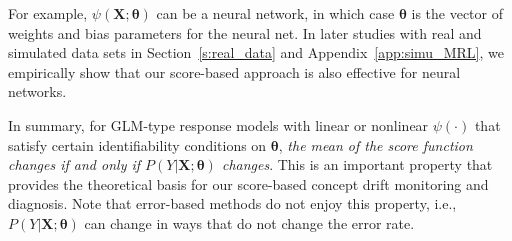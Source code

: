 \documentclass[twoside,11pt]{article}
\begin{document}
For example, $ \psi (\bm{X}; \bm { \theta})$ can be a neural network, in which case $\bm { \theta}$ is the vector of weights and bias parameters for the neural net. In later studies with real and simulated data sets in Section~\ref{s:real_data} and Appendix~\ref{app:simu_MRL}, we empirically show that our score-based approach is also effective for neural networks.

In summary, for GLM-type response models with linear or nonlinear $\psi(\cdot)$ that satisfy certain identifiability conditions on $\bm{\theta}$, \textit{the mean of the score function changes if and only if $P(Y|\bm{X};\bm{\theta})$ changes}. This is an important property that provides the theoretical basis for our score-based concept drift monitoring and diagnosis. Note that error-based methods do not enjoy this property, i.e., $P(Y|\bm{X};\bm{\theta})$ can change in ways that do not change the error rate.
\end{document}
